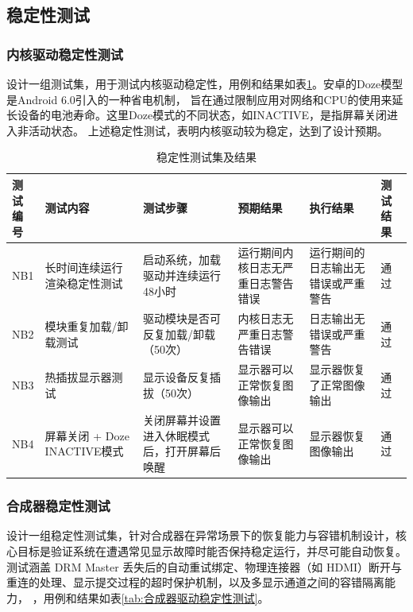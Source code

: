 \subsection{稳定性测试}

\subsubsection{内核驱动稳定性测试}

设计一组测试集，用于测试内核驱动稳定性，用例和结果如表\ref{tab:内核驱动稳定性测试}。安卓的Doze模型是Android 6.0引入的一种省电机制，
旨在通过限制应用对网络和CPU的使用来延长设备的电池寿命。这里Doze模式的不同状态，如INACTIVE，是指屏幕关闭进入非活动状态。
上述稳定性测试，表明内核驱动较为稳定，达到了设计预期。

\begin{table}[H]
  \centering
  \caption{稳定性测试集及结果}
  \label{tab:内核驱动稳定性测试}
  \begin{tabular}{lp{3cm}p{3cm}p{2cm}p{2cm}l}
    \toprule
    \makecell[l]{测试\\编号} & 测试内容  &  测试步骤  & 预期结果 & 执行结果 & 测试结果\\
    \midrule
    NB1 & 长时间连续运行渲染稳定性测试 & 启动系统，加载驱动并连续运行48小时 & 运行期间内核日志无严重日志警告错误 & 运行期间的日志输出无错误或严重警告 & 通过\\
    NB2 & 模块重复加载/卸载测试 & 驱动模块是否可反复加载/卸载（50次） & 内核日志无严重日志警告错误 & 日志输出无错误或严重警告  & 通过\\
    NB3 & 热插拔显示器测试 & 显示设备反复插拔（50次） & 显示器可以正常恢复图像输出 & 显示器恢复了正常图像输出 & 通过\\
    NB4 & 屏幕关闭 + Doze INACTIVE模式 & 关闭屏幕并设置进入休眠模式后，打开屏幕后唤醒 & 显示器可以正常恢复图像输出 & 显示器恢复图像输出 & 通过\\
    \bottomrule
  \end{tabular}
  \note{}
\end{table}

\subsubsection{合成器稳定性测试}

设计一组稳定性测试集，针对合成器在异常场景下的恢复能力与容错机制设计，核心目标是验证系统在遭遇常见显示故障时能否保持稳定运行，并尽可能自动恢复。
测试涵盖 DRM Master 丢失后的自动重试绑定、物理连接器（如 HDMI）断开与重连的处理、显示提交过程的超时保护机制，以及多显示通道之间的容错隔离能力，
，用例和结果如表\ref{tab:合成器驱动稳定性测试}。

